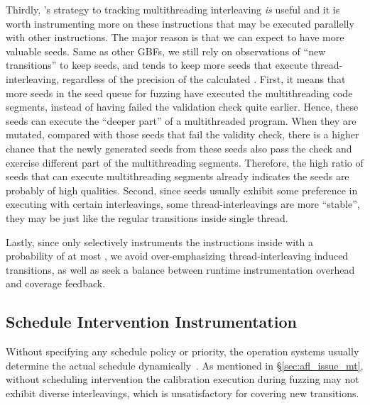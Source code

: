 Thirdly, \MTIns's strategy to tracking multithreading interleaving \emph{is} useful and it is worth instrumenting more on these instructions that may be executed parallelly with other instructions. The major reason is that we can expect to have more valuable seeds. Same as other GBFs, we still rely on observations of ``new transitions'' to keep seeds, and \MTIns tends to keep more seeds that execute thread-interleaving, regardless of the precision of the calculated \mtiscope. First, it means that more seeds in the seed queue for fuzzing have executed the multithreading code segments, instead of having failed the validation check quite earlier. Hence, these seeds can execute the ``deeper part'' of a multithreaded program. When they are mutated, compared with those seeds that fail the validity check, there is a higher chance that the newly generated seeds from these seeds also pass the check and exercise different part of the multithreading segments. Therefore, the high ratio of seeds that can execute multithreading segments already indicates the seeds are probably of high qualities. Second, since seeds usually exhibit some preference in executing with certain interleavings, some thread-interleavings are more ``stable'', they may be just like the regular transitions inside single thread.

Lastly, since \MTIns only selectively instruments the instructions inside \mtiscope with a probability of at most \mtpnO, we avoid over-emphasizing thread-interleaving induced transitions, as well as seek a balance between runtime instrumentation overhead and coverage feedback. 





\subsection{Schedule Intervention Instrumentation}\label{sec:instrument_schedule}

Without specifying any schedule policy or priority, the operation systems usually determine the actual schedule dynamically~\cite{tlpi,posixstd}. As mentioned in \S\ref{sec:afl_issue_mt}, without scheduling intervention the calibration execution during fuzzing may not exhibit diverse interleavings, which is unsatisfactory for covering new transitions. 

